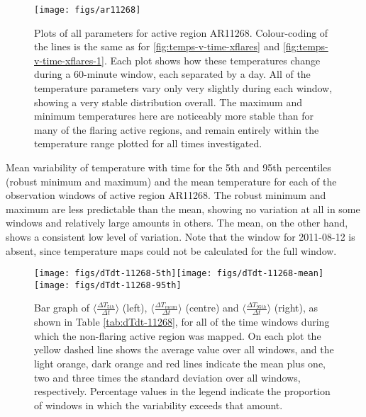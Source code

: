 \documentclass{article}
\begin{document}
\begin{figure}
\begin{centering}
\texttt{[image: figs/ar11268]} 
\par\end{centering}

\caption{Plots of all parameters for active region AR11268. Colour-coding of
the lines is the same as for \ref{fig:temps-v-time-xflares} and \ref{fig:temps-v-time-xflares-1}.
Each plot shows how these temperatures change during a 60-minute window,
each separated by a day. All of the temperature parameters vary only
very slightly during each window, showing a very stable distribution
overall. The maximum and minimum temperatures here are noticeably
more stable than for many of the flaring active regions, and remain
entirely within the temperature range plotted for all times investigated.
\textbf{}\label{fig:ar11268-allparams}}
\end{figure}


\begin{table}
\caption{Mean variability of temperature with time for the 5th and 95th percentiles
(robust minimum and maximum) and the mean temperature for each of
the observation windows of active region AR11268. The robust minimum
and maximum are less predictable than the mean, showing no variation
at all in some windows and relatively large amounts in others. The
mean, on the other hand, shows a consistent low level of variation.
Note that the window for 2011-08-12 is absent, since temperature maps
could not be calculated for the full window. \label{tab:dTdt-11268}}


\end{table}


\begin{figure}
\begin{centering}
\texttt{[image: figs/dTdt-11268-5th]}\texttt{[image: figs/dTdt-11268-mean]}\texttt{[image: figs/dTdt-11268-95th]}
\par\end{centering}

\caption{Bar graph of $\langle\frac{\Delta T_{5th}}{\Delta t}\rangle$ (left),
$\langle\frac{\Delta T_{mean}}{\Delta t}\rangle$ (centre) and $\langle\frac{\Delta T_{95th}}{\Delta t}\rangle$
(right), as shown in Table \ref{tab:dTdt-11268}, for all of the time
windows during which the non-flaring active region was mapped. On
each plot the yellow dashed line shows the average value over all
windows, and the light orange, dark orange and red lines indicate
the mean plus one, two and three times the standard deviation over
all windows, respectively. Percentage values in the legend indicate
the proportion of windows in which the variability exceeds that amount.
\label{fig:Bar-graph-quiet}}
\end{figure}
\end{document}
